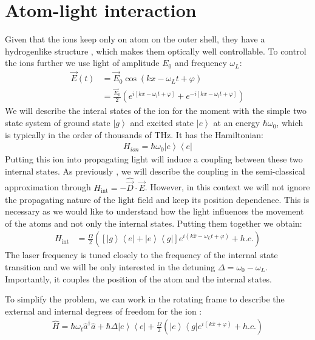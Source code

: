 \documentclass[10pt]{article}
\let\cite\citep
\providecommand\citep{\cite}
\newcommand{\bra}[1]{\ensuremath{\left\langle#1\right|}}
\newcommand{\ket}[1]{\ensuremath{\left|#1\right\rangle}}
\begin{document}
\section{Atom-light interaction}
Given that the ions keep only on atom on the outer shell, they have a hydrogenlike structure \cite{Jendrzejewskia, Jendrzejewskib}, which makes them optically well controllable. To control the ions further we use light of amplitude $E_0$ and frequency $\omega_L$:
\begin{align}
\vec{E}(t) &= \vec{E}_0 \cos(kx - \omega_L t+\varphi)\\
&= \frac{\vec{E}_0}{2} \left(e^{i[kx - \omega_lt+\varphi]}+e^{-i[kx-\omega_lt+\varphi]}\right) 
\end{align}
We will describe the interal states of the ion for the moment with the simple two state system of ground state $\ket{g}$ and excited state $\ket{e}$ at an energy $\hbar \omega_0$, which is typically in the order of thousands of THz. It has the Hamiltonian:
\begin{align}
H_{ion} = \hbar \omega_0 \ket{e}\bra{e}
\end{align}
Putting this ion into propagating light will induce a coupling between these two internal states. As previously , we will describe the coupling in the semi-classical approximation through $H_\textrm{int} = -\hat{\vec{D}} \cdot \vec{E} $. However, in this context we will not ignore the propagating nature of the light field and keep its position dependence. This is necessary as we would like to understand how the light influences the movement of the atoms and not only the internal states. Putting them together we obtain:
\begin{align}
H_\textrm{int} &= \frac{\Omega}{2}\left([\ket{g}\bra{e}+\ket{e}\bra{g}]e^{i(k \hat{x} - \omega_L t+\varphi)} + h.c.\right)
\end{align}
The laser frequency is tuned closely to the frequency of the internal state transition and we will be only interested in the detuning $\Delta = \omega_0 - \omega_L$. Importantly, it couples  the position of the atom and the internal states.

To simplify the problem, we can work in the rotating frame to describe the external and internal degrees of freedom for the ion \cite{Jendrzejewskic}:
\begin{align}\label{Eq:DressedAtomLightInteraction}
\hat{H}= \hbar \omega_t \hat{a}^\dag \hat{a} + \hbar\Delta \ket{e}\bra{e} + \frac{\Omega}{2}\left(\ket{e}\bra{g}e^{i\left(k \hat{x}+\varphi\right)} + h.c.\right)
\end{align}
\end{document}
